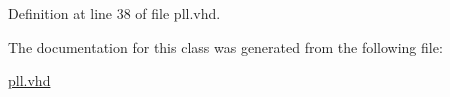 \subsubsection[{std\+\_\+logic\+\_\+1164}]{\hspace{0.3cm}{\ttfamily [Package]}}\label{classpll_acd03516902501cd1c7296a98e22c6fcb}


Definition at line 38 of file pll.\+vhd.



The documentation for this class was generated from the following file\+:\begin{DoxyCompactItemize}
\item 
\hyperlink{pll_8vhd}{pll.\+vhd}\end{DoxyCompactItemize}
